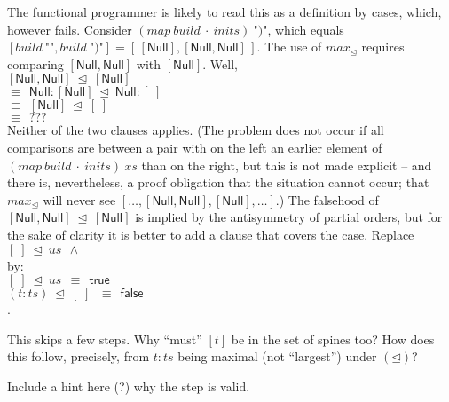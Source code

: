 The functional programmer is likely to read this as a definition by cases, which, however fails.
Consider $(map~build~\cdot~inits)~\texttt{")"}$, which equals $[build~\texttt{""}, build~\texttt{")"}] = [\,[\mathsf{Null}], [\mathsf{Null},\mathsf{Null}]\,]$. The use of $max_{\unlhd}$ requires comparing $[\mathsf{Null},\mathsf{Null}]$ with $[\mathsf{Null}]$. Well,
\\\hspace*{2.75em}
$[\mathsf{Null},\mathsf{Null}] ~\unlhd~ [\mathsf{Null}]$
\\\hspace*{1em}
$\equiv~~\mathsf{Null} : [\mathsf{Null}] ~\unlhd~ \mathsf{Null} : [\;]$
\\\hspace*{1em}
$\equiv~~[\mathsf{Null}] ~\unlhd~ [\;]$
\\\hspace*{1em}
$\equiv~~\mathrm{???}$
\\
Neither of the two clauses applies. (The problem does not occur if all comparisons are between a pair with on the left an earlier element of $(map~build~\cdot~inits)~xs$ than on the right, but this is not made explicit -- and there is, nevertheless, a proof obligation that the situation cannot occur; that $max_{\unlhd}$ will never see $[\ldots, [\mathsf{Null},\mathsf{Null}], [\mathsf{Null}], \ldots]$.) The falsehood of $[\mathsf{Null},\mathsf{Null}] ~\unlhd~ [\mathsf{Null}]$ is implied by the antisymmetry of partial orders, but for the sake of clarity it is better to add a clause that covers the case.
Replace
\\\hspace*{3em}
$[\;] ~\unlhd~ us~~\wedge $
\\by:
\\\hspace*{3em}
$[\;] ~\unlhd~ us~~\equiv~~\mathsf{true}$
\\\hspace*{1em}
$(t : ts) ~\unlhd~ [\;]\,~~\equiv~~\mathsf{false}$
\\.

This skips a few steps. Why ``must'' $[t]$ be in the set of spines too? How does this follow, precisely, from $t : ts$ being maximal (not ``largest'') under $({\unlhd})$? 


Include a hint here (?) why the step is valid.

